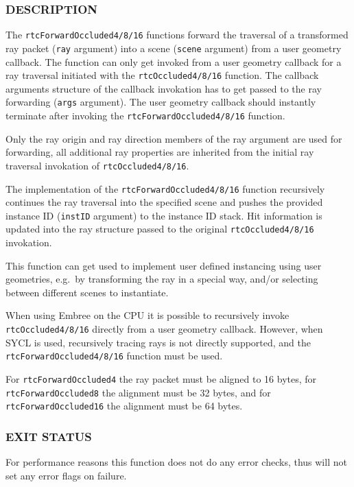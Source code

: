 \subsubsection{DESCRIPTION}\label{description}

The \texttt{rtcForwardOccluded4/8/16} functions forward the traversal of
a transformed ray packet (\texttt{ray} argument) into a scene
(\texttt{scene} argument) from a user geometry callback. The function
can only get invoked from a user geometry callback for a ray traversal
initiated with the \texttt{rtcOccluded4/8/16} function. The callback
arguments structure of the callback invokation has to get passed to the
ray forwarding (\texttt{args} argument). The user geometry callback
should instantly terminate after invoking the
\texttt{rtcForwardOccluded4/8/16} function.

Only the ray origin and ray direction members of the ray argument are
used for forwarding, all additional ray properties are inherited from
the initial ray traversal invokation of \texttt{rtcOccluded4/8/16}.

The implementation of the \texttt{rtcForwardOccluded4/8/16} function
recursively continues the ray traversal into the specified scene and
pushes the provided instance ID (\texttt{instID} argument) to the
instance ID stack. Hit information is updated into the ray structure
passed to the original \texttt{rtcOccluded4/8/16} invokation.

This function can get used to implement user defined instancing using
user geometries, e.g.~by transforming the ray in a special way, and/or
selecting between different scenes to instantiate.

When using Embree on the CPU it is possible to recursively invoke
\texttt{rtcOccluded4/8/16} directly from a user geometry callback.
However, when SYCL is used, recursively tracing rays is not directly
supported, and the \texttt{rtcForwardOccluded4/8/16} function must be
used.

For \texttt{rtcForwardOccluded4} the ray packet must be aligned to 16
bytes, for \texttt{rtcForwardOccluded8} the alignment must be 32 bytes,
and for \texttt{rtcForwardOccluded16} the alignment must be 64 bytes.

\subsubsection{EXIT STATUS}\label{exit-status}

For performance reasons this function does not do any error checks, thus
will not set any error flags on failure.


